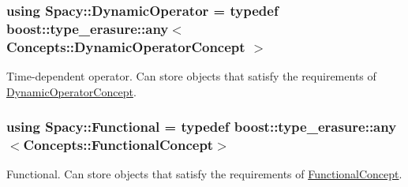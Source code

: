\label{group__SpacyGroup_gaad10aa7d5443703377b768fa41a3c7ea_DynamicLinearOperatorAnchor}%
\hypertarget{group__SpacyGroup_gaad10aa7d5443703377b768fa41a3c7ea_DynamicLinearOperatorAnchor}{}%
\hypertarget{group__SpacyGroup_ga8e692134dfe46346d5692acfd1a9bd8e_ga8e692134dfe46346d5692acfd1a9bd8e}{}
\subsubsection[{Dynamic\+Operator}]{\setlength{\rightskip}{0pt plus 5cm}using {\bf Spacy\+::\+Dynamic\+Operator} = typedef boost\+::type\+\_\+erasure\+::any$<$ Concepts\+::\+Dynamic\+Operator\+Concept $>$}\label{group__SpacyGroup_ga8e692134dfe46346d5692acfd1a9bd8e_ga8e692134dfe46346d5692acfd1a9bd8e}


Time-\/dependent operator. Can store objects that satisfy the requirements of \hyperlink{group__ConceptGroup_ga2c979d268f0ca7a436776a9631d10af7_DynamicOperatorConceptAnchor}{Dynamic\+Operator\+Concept}. 

\label{group__SpacyGroup_ga8e692134dfe46346d5692acfd1a9bd8e_DynamicOperatorAnchor}%
\hypertarget{group__SpacyGroup_ga8e692134dfe46346d5692acfd1a9bd8e_DynamicOperatorAnchor}{}%
\hypertarget{group__SpacyGroup_ga673218f603c93790864aef12c89d3a35_ga673218f603c93790864aef12c89d3a35}{}
\subsubsection[{Functional}]{\setlength{\rightskip}{0pt plus 5cm}using {\bf Spacy\+::\+Functional} = typedef boost\+::type\+\_\+erasure\+::any$<$Concepts\+::\+Functional\+Concept$>$}\label{group__SpacyGroup_ga673218f603c93790864aef12c89d3a35_ga673218f603c93790864aef12c89d3a35}


Functional. Can store objects that satisfy the requirements of \hyperlink{group__ConceptGroup_ga5273b50bd3e8c9a3f5a1e6b5f170836d_FunctionalConceptAnchor}{Functional\+Concept}. 

\label{group__SpacyGroup_ga673218f603c93790864aef12c89d3a35_FunctionalAnchor}%
\hypertarget{group__SpacyGroup_ga673218f603c93790864aef12c89d3a35_FunctionalAnchor}{}%
\hypertarget{group__SpacyGroup_ga584f7b9d82a844302ba0d77c3a1b6640_ga584f7b9d82a844302ba0d77c3a1b6640}{}
